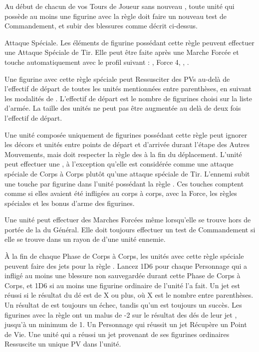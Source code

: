 Au début de chacun de vos Tours de Joueur sans nouveau \master{}, toute unité qui possède au moins une figurine avec la règle \ashestoashes{} doit faire un nouveau test de Commandement, et subir des blessures comme décrit ci-dessus.

\armyspecialruleentry{\wailofwoe}

Attaque Spéciale. Les éléments de figurine possédant cette règle peuvent effectuer une Attaque Spéciale de Tir. Elle peut être faite après une Marche Forcée et touche automatiquement avec le profil suivant : , Force 4, \magicalattacks{}, .



Une figurine avec cette règle spéciale peut Ressusciter des PVs au-delà de l'effectif de départ de toutes les unités mentionnées entre parenthèses, en suivant les modalités de \raisewounds{}. L'effectif de départ est le nombre de figurines choisi sur la liste d'armée. La taille des unités ne peut pas être augmentée au delà de deux fois l'effectif de départ.

\newpage
\armyspecialruleentry{\reaper}

Une unité composée uniquement de figurines possédant cette règle peut ignorer les décors et unités entre points de départ et d'arrivée durant l'étape des Autres Mouvements, mais doit respecter la règle des  à la fin du déplacement. L'unité peut effectuer une \sweepingattack{}, à l'exception qu'elle est considérée comme une attaque spéciale de Corps à Corps plutôt qu'une attaque spéciale de Tir. L'ennemi subit une touche par figurine dans l'unité possédant la règle \reaper{}. Ces touches comptent comme si elles avaient été infligées au corps à corps, avec la Force, les règles spéciales et les bonus d'arme des figurines.


Une unité \vampiric{} peut effectuer des Marches Forcées même lorsqu'elle se trouve hors de portée de la \inspiringpresence{} du Général. Elle doit toujours effectuer un test de Commandement si elle se trouve dans un rayon de  d'une unité ennemie.

À la fin de chaque Phase de Corps à Corps, les unités avec cette règle spéciale peuvent faire des jets pour la règle \vampiric{}. Lancez 1D6 pour chaque Personnage \vampiric{} qui a infligé au moins une blessure non sauvegardée durant cette Phase de Corps à Corps, et 1D6 si au moins une figurine ordinaire \vampiric{} de l'unité l'a fait. Un jet \vampiric{} est réussi si le résultat du dé est de X ou plus, où X est le nombre entre parenthèses. Un résultat de  est toujours un échec, tandis qu'un  est toujours un succès. Les figurines avec la règle \largetarget{} ont un malus de -2 sur le résultat des dés de leur jet \vampiric{}, jusqu'à un minimum de 1. Un Personnage qui réussit un jet \vampiric{} Récupère un Point de Vie. Une unité qui a réussi un jet \vampiric{} provenant de ses figurines ordinaires Ressuscite un unique PV dans l'unité.

